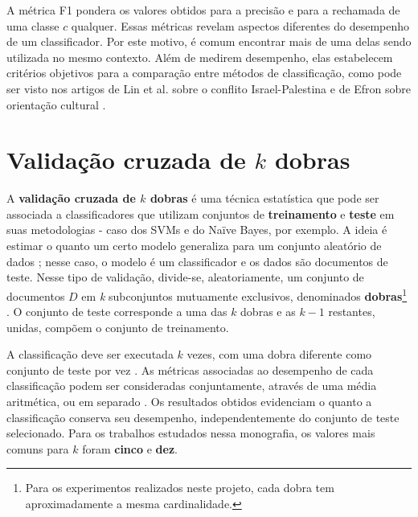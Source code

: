 A métrica F1 pondera os valores obtidos para a precisão e para a rechamada de uma classe \ensuremath{c} qualquer. Essas métricas revelam aspectos diferentes do desempenho de um classificador. Por este motivo, é comum encontrar mais de uma delas sendo utilizada no mesmo contexto. Além de medirem desempenho, elas estabelecem critérios objetivos para a comparação entre métodos de classificação, como pode ser visto nos artigos de Lin et al. sobre o conflito Israel-Palestina \cite{lin-et-al2006} e de Efron sobre orientação cultural \cite{efron}. 


\section{Validação cruzada de \ensuremath{k} dobras}
\label{validacao}

A \textbf{validação cruzada de \ensuremath{k} dobras} é uma técnica estatística que pode ser associada a classificadores que utilizam conjuntos de \textbf{treinamento} e \textbf{teste} em suas metodologias - caso dos SVMs e do Naïve Bayes, por exemplo. A ideia é estimar o quanto um certo modelo generaliza para um conjunto aleatório de dados \cite{payam-leitang}; nesse caso, o modelo é um classificador e os dados são documentos de teste. Nesse tipo de validação, divide-se, aleatoriamente, um conjunto de documentos \ensuremath{D} em \emph{k} subconjuntos mutuamente exclusivos, denominados \textbf{dobras}\footnote{Para os experimentos realizados neste projeto, cada dobra tem aproximadamente a mesma cardinalidade.} \cite{ron-kohavi}. O conjunto de teste corresponde a uma das \ensuremath{k} dobras e as \ensuremath{k - 1} restantes, unidas, compõem o conjunto de treinamento.

A classificação deve ser executada \ensuremath{k} vezes, com uma dobra diferente como conjunto de teste por vez \cite{ron-kohavi}. As métricas associadas ao desempenho de cada classificação podem ser consideradas conjuntamente, através de uma média aritmética, ou em separado \cite{payam-leitang}. Os resultados obtidos evidenciam o quanto a classificação conserva seu desempenho, independentemente do conjunto de teste selecionado. Para os trabalhos estudados nessa monografia, os valores mais comuns para \ensuremath{k} foram \textbf{cinco} e \textbf{dez}. 


